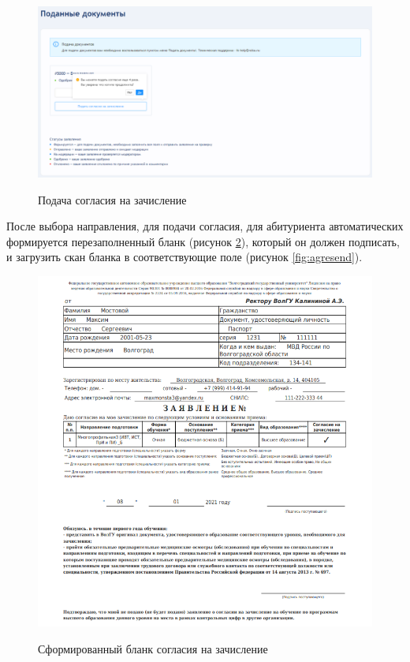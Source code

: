 \begin{figure}[H]
\begin{center}
\includegraphics[width=0.9\hsize]{fig/agree-start.png}\\[2mm]
\caption{Подача согласия на зачисление}\label{fig:agreestart}
\end{center}
\end{figure}

После выбора направления, для подачи согласия, для абитуриента автоматических формируется перезаполненный бланк (рисунок \ref{fig:agreedoc}), который он должен подписать, и загрузить скан бланка в соответствующие поле (рисунок \ref{fig:agresend}).

\begin{figure}[H]
\begin{center}
\includegraphics[width=0.9\hsize]{fig/agree-doc.png}\\[2mm]
\caption{Сформированный бланк согласия на зачисление}\label{fig:agreedoc}
\end{center}
\end{figure}

